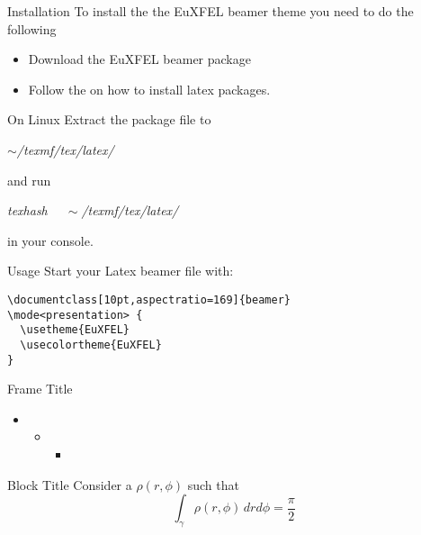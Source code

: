 \begin{frame}{Installation}
  To install the the EuXFEL beamer theme you need to do the following
  \begin{itemize}
  \item Download the EuXFEL beamer package
  \item Follow the \href{https://docs.xfel.eu/share/proxy/alfresco/api/node/content/workspace/SpacesStore/92e260f4-e0a7-4463-a812-40a180bd6e75/IN-2012-003-01_LaTeX_User_Guide.pdf?a=true}{} on how to install latex packages.
  \end{itemize}
  \begin{block}{On Linux}
    Extract the package file to\\
    \centerline{\textit{$\sim$/texmf/tex/latex/}}
    and run
    \centerline{ \textit{texhash   $\quad\sim$/texmf/tex/latex/ }}
    in your console.
  \end{block}
\end{frame}

\begin{frame}[fragile]{Usage}
  Start your Latex beamer file with:
  \begin{block}{}
    \begin{verbatim}
\documentclass[10pt,aspectratio=169]{beamer}
\mode<presentation> {
  \usetheme{EuXFEL}
  \usecolortheme{EuXFEL}
}

\end{verbatim}
  \end{block}
\end{frame}

\begin{frame}{Frame Title}
  \begin{itemize}
  \item \lipsum[2][2]
    \begin{itemize}
    \item \lipsum[3][2]
      \begin{itemize}
      \item \lipsum[4][2]          
      \end{itemize}
    \end{itemize}
  \end{itemize}
  
  \begin{block}{Block Title}
    Consider a  $\rho(r,\phi)$ such that
    \begin{equation}
      \label{eq:1}
      \int_{\gamma} \rho(r,\phi)\, drd\phi=\frac{\pi}{2}
    \end{equation}
  \end{block}
\end{frame}


